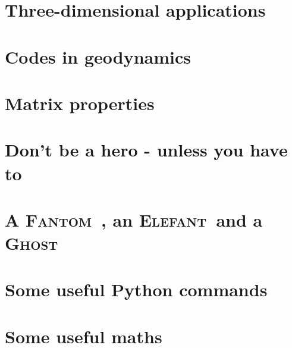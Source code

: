 \documentclass[a4paper]{article}
\newcommand{\elefant}{{\textsc{Elefant~}{}}}
\newcommand{\fantom}{{\textsc{Fantom~}{}}}
\newcommand{\ghost}{{\textsc{Ghost~}{}}}
\numberwithin{equation}{section}
\begin{document}
\appendix %

\newpage %
\section{Three-dimensional applications}  %
\newpage %
\section{Codes in geodynamics \label{app:codes} } %
\newpage %
\section{Matrix properties}  %
\newpage %
\section{Don’t be a hero - unless you have to}  %
\newpage %
\section{A \fantom, an \elefant and a \ghost}  %
\newpage %
\section{Some useful Python commands}  %
\newpage %
\section{Some useful maths}  \label{app_maths} %
\newpage %
\newpage %
\end{document}
